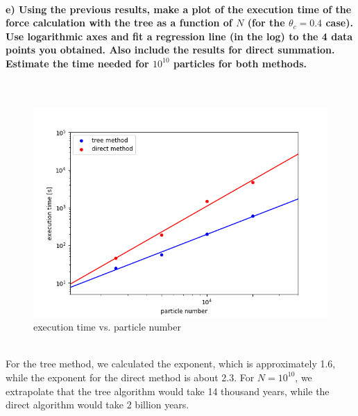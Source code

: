 \paragraph{e)
    Using the previous results, make a plot of the execution 
    time of the force calculation with the tree as a function of 
    $N$ (for the $\theta_c=0.4$ case). Use logarithmic axes and 
    fit a regression line (in the log) to the 4 data points you 
    obtained. Also include the results for direct summation. 
    Estimate the time needed for $10^{10}$ particles for both 
    methods.
} \ \\
    \begin{figure}[h!]
        \centering
        \includegraphics[width=\textwidth]{../plot/runtimes.png}
        \caption{execution time vs. particle number}
    \end{figure} \ \\ 
    For the tree method, we calculated the exponent,
    which is approximately 1.6, while the exponent for 
    the direct method is about 2.3. For $N=10^{10}$, 
    we extrapolate that the tree algorithm would take 
    14 thousand years, while the direct algorithm 
    would take 2 billion years.


